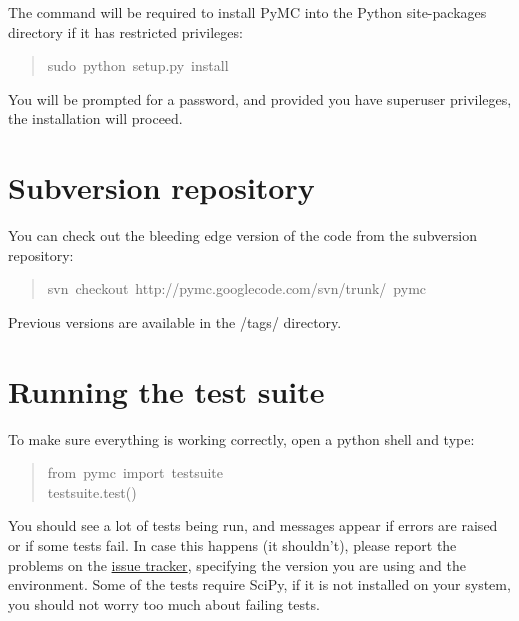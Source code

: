 The  command will be required to install PyMC into the Python site-packages
directory if it has restricted privileges:
\begin{quote}{\ttfamily \raggedright \noindent
sudo~python~setup.py~install
}\end{quote}

You will be prompted for a  password, and provided you have superuser privileges,
the installation will proceed.



\hypertarget{subversion-repository}{}
\section*{Subversion repository}
\label{subversion-repository}

You can check out the bleeding edge version of the code from the subversion
repository:
\begin{quote}{\ttfamily \raggedright \noindent
svn~checkout~http://pymc.googlecode.com/svn/trunk/~pymc
}\end{quote}

Previous versions are available in the /tags/ directory.



\hypertarget{running-the-test-suite}{}
\section*{Running the test suite}
\label{running-the-test-suite}

To make sure everything is working correctly, open a python shell and type:
\begin{quote}{\ttfamily \raggedright \noindent
from~pymc~import~testsuite~\\
testsuite.test()
}\end{quote}

You should see a lot of tests being run, and messages appear if errors are
raised or if some tests fail. In case this happens (it shouldn't), please report
the problems on the \href{http://code.google.com/p/pymc/issues/list.}{issue tracker}, specifying the version you are using and the
environment. Some of the tests require SciPy, if it is not installed on your
system, you should not worry too much about failing tests.


